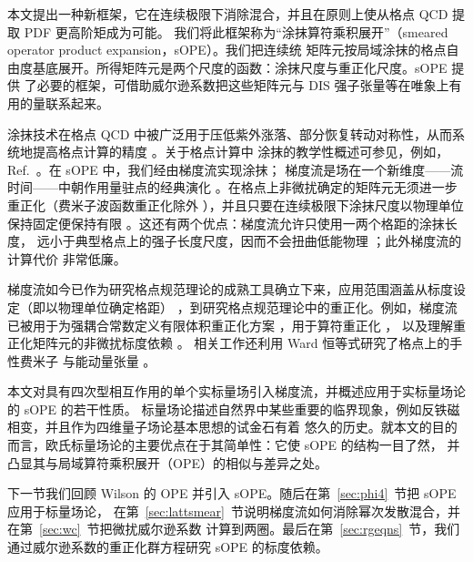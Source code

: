 本文提出一种新框架，它在连续极限下消除混合，并且在原则上使从格点 QCD 提取 PDF 更高阶矩成为可能。
我们将此框架称为``涂抹算符乘积展开''（smeared operator product expansion，sOPE）。我们把连续统
矩阵元按局域涂抹的格点自由度基底展开。所得矩阵元是两个尺度的函数：涂抹尺度与重正化尺度。sOPE 提供
了必要的框架，可借助威尔逊系数把这些矩阵元与 DIS 强子张量等在唯象上有用的量联系起来。

涂抹技术在格点 QCD 中被广泛用于压低紫外涨落、部分恢复转动对称性，从而系统地提高格点计算的精度
\cite{Morningstar:2003gk,Hasenfratz:2001hp,Bernard:1999kc,Albanese:1987as}。关于格点计算中
涂抹的教学性概述可参见，例如，Ref.~\cite{Gattringer:2010zz}。在 sOPE 中，我们经由梯度流实现涂抹；
梯度流是场在一个新维度——流时间——中朝作用量驻点的经典演化
\cite{Luscher:2013cpa,Luscher:2011bx,Lohmayer:2011si,Luscher:2010iy,
Narayanan:2006rf}。在格点上非微扰确定的矩阵元无须进一步重正化（费米子波函数重正化除外
\cite{Luscher:2013cpa}），并且只要在连续极限下涂抹尺度以物理单位保持固定便保持有限
\cite{Makino:2014sta,Luscher:2011bx}。这还有两个优点：梯度流允许只使用一两个格距的涂抹长度，
远小于典型格点上的强子长度尺度，因而不会扭曲低能物理 \cite{Davoudi:2012ya}；此外梯度流的计算代价
非常低廉。

梯度流如今已作为研究格点规范理论的成熟工具确立下来，应用范围涵盖从标度设定（即以物理单位确定格距）
\cite{Borsanyi:2012zr,Borsanyi:2012zs,Bazavov:2013gca,Fodor:2014cpa,
Cheng:2014jba}，到研究格点规范理论中的重正化。例如，梯度流已被用于为强耦合常数定义有限体积重正化方案
\cite{Fodor:2012td,Fritzsch:2013yxa,Fritzsch:2013hda,
Ramos:2013gda,Rantaharju:2013bva}，用于算符重正化 \cite{Monahan:2013lwa}，
以及理解重正化矩阵元的非微扰标度依赖 \cite{Luscher:2014kea}。
相关工作还利用 Ward 恒等式研究了格点上的手性费米子 \cite{Shindler:2013bia}
与能动量张量 \cite{Suzuki:2013gza,DelDebbio:2013zaa, Makino:2014taa}。

本文对具有四次型相互作用的单个实标量场引入梯度流，并概述应用于实标量场论的 sOPE 的若干性质。
标量场论描述自然界中某些重要的临界现象，例如反铁磁相变，并且作为四维量子场论基本思想的试金石有着
悠久的历史。就本文的目的而言，欧氏标量场论的主要优点在于其简单性：它使 sOPE 的结构一目了然，
并凸显其与局域算符乘积展开（OPE）的相似与差异之处。

下一节我们回顾 Wilson 的 OPE 并引入 sOPE。随后在第~\ref{sec:phi4}~节把 sOPE 应用于标量场论，
在第~\ref{sec:lattsmear}~节说明梯度流如何消除幂次发散混合，并在第~\ref{sec:wc}~节把微扰威尔逊系数
计算到两圈。最后在第~\ref{sec:rgeqns}~节，我们通过威尔逊系数的重正化群方程研究 sOPE 的标度依赖。
